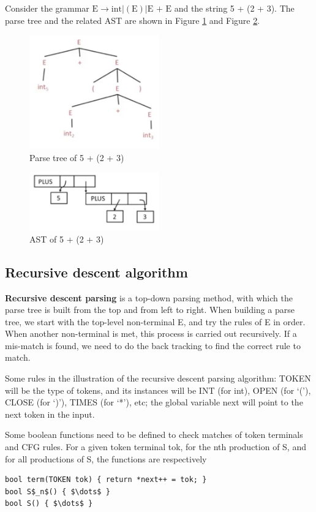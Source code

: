 Consider the grammar $\text{E} \rightarrow \text{int} | (\text{E}) | \text{E + E}$ and the string 5 + (2 + 3). The parse tree and the related AST are shown in Figure \ref{parsetree} and Figure \ref{ast}.
\begin{figure}
\centering
\includegraphics[width = 0.5\textwidth]{parsetree.jpg}
\caption{Parse tree of 5 + (2 + 3)}\label{parsetree}
\end{figure}
\begin{figure}
\centering
\includegraphics[width = 0.5\textwidth]{ast.jpg}
\caption{AST of 5 + (2 + 3)}\label{ast}
\end{figure}
\subsection{Recursive descent algorithm}
{\bf Recursive descent parsing} is a top-down parsing method, with which the parse tree is built from the top and from left to right. When building a parse tree, we start with the top-level non-terminal E, and try the rules of E in order. When another non-terminal is met, this process is carried out recursively. If a mis-match is found, we need to do the back tracking to find the correct rule to match.

Some rules in the illustration of the recursive descent parsing algorithm: TOKEN will be the type of tokens, and its instances will be INT (for int), OPEN (for `('), CLOSE (for `)'), TIMES (for `*'), etc; the global variable {\sf next} will point to the next token in the input.

Some boolean functions need to be defined to check matches of token terminals and CFG rules. For a given token terminal {\sf tok}, for the nth production of S, and for all productions of S, the functions are respectively 
\begin{lstlisting}[mathescape]
bool term(TOKEN tok) { return *next++ = tok; }
bool S$_n$() { $\dots$ }
bool S() { $\dots$ }
\end{lstlisting}

